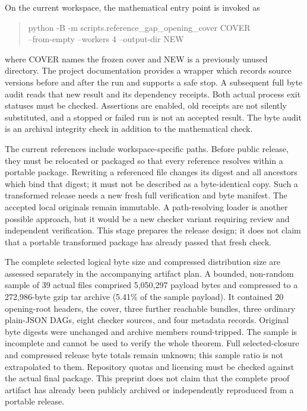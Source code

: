 \documentclass[11pt]{article}
\theoremstyle{definition}
\theoremstyle{remark}
\begin{document}
On the current workspace, the mathematical entry point is invoked as
\begin{quote}\small\ttfamily
python -B -m scripts.reference\_gap\_opening\_cover COVER\\
\hspace*{1em}--from-empty --workers 4 --output-dir NEW
\end{quote}
where COVER names the frozen cover and NEW is a previously unused directory.
The project documentation provides a wrapper which records source versions
before and after the run and supports a safe stop. A subsequent full byte
audit reads that new result and its dependency receipts. Both actual process
exit statuses must be checked. Assertions are enabled, old receipts are not
silently substituted, and a stopped or failed run is not an accepted result.
The byte audit is an archival integrity check in addition to the mathematical
check.

The current references include workspace-specific paths. Before public
release, they must be relocated or packaged so that every reference resolves
within a portable package. Rewriting a referenced file changes its digest
and all ancestors which bind that digest; it must not be described as a
byte-identical copy. Such a transformed release needs a new fresh full
verification and byte manifest. The accepted local originals remain
immutable. A path-resolving loader is another possible approach, but it
would be a new checker variant requiring review and independent
verification. This stage prepares the release design; it does not claim
that a portable transformed package has already passed that fresh check.

The complete selected logical byte size and compressed distribution size
are assessed separately in the accompanying artifact plan. A bounded,
non-random sample of 39 actual files comprised 5,050,297 payload bytes and
compressed to a 272,986-byte gzip tar archive (5.41\% of the sample payload).
It contained 20 opening-root headers, the cover, three further reachable
bundles, three ordinary plain-JSON DAGs, eight checker sources, and four
metadata records. Original byte digests were unchanged and archive members
round-tripped. The sample is incomplete and cannot be used to verify the
whole theorem. Full selected-closure and compressed release byte totals
remain unknown; this sample ratio is not extrapolated to them. Repository quotas and
licensing must be checked against the actual final package. This preprint does not claim that the complete proof artifact has already
been publicly archived or independently reproduced from a portable release.
\end{document}
